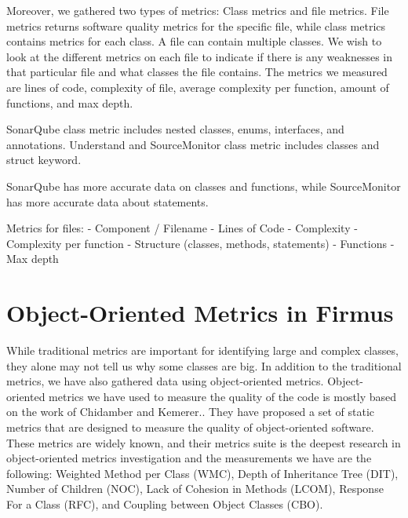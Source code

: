

Moreover, we gathered two types of metrics: Class metrics and file metrics. File metrics returns software quality metrics for the specific file, while class metrics contains metrics for each class. A file can contain multiple classes. We wish to look at the different metrics on each file to indicate if there is any weaknesses in that particular file and what classes the file contains. The metrics we measured are lines of code, complexity of file, average complexity per function, amount of functions, and max depth. 

SonarQube class metric includes nested classes, enums, interfaces, and annotations. Understand and SourceMonitor class metric includes classes and struct keyword. 

SonarQube has more accurate data on classes and functions, while SourceMonitor has more accurate data about statements. 






Metrics for files:
- Component / Filename
- Lines of Code
- Complexity
- Complexity per function
- Structure (classes, methods, statements)
- Functions
- Max depth





















\section{Object-Oriented Metrics in Firmus}
While traditional metrics are important for identifying large and complex classes, they alone may not tell us why some classes are big. In addition to the traditional metrics, we have also gathered data using object-oriented metrics. Object-oriented metrics we have used to measure the quality of the code is mostly based on the work of Chidamber and Kemerer.\cite{chidamber1994metrics}. They have proposed a set of static metrics that are designed to measure the quality of object-oriented software. These metrics are widely known, and their metrics suite is the deepest research in object-oriented metrics investigation and the measurements we have are the following: Weighted Method per Class (WMC), Depth of Inheritance Tree (DIT), Number of Children (NOC), Lack of Cohesion in Methods (LCOM), Response For a Class (RFC), and Coupling between Object Classes (CBO). 


